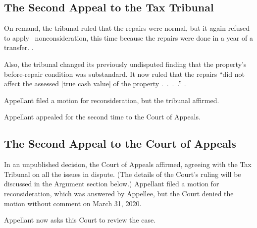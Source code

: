 \documentclass[12pt,\documentclassflag]{michiganCourtOfAppealsBrief}
\begin{document}
\subsection{The Second Appeal to the Tax Tribunal}

On remand, the tribunal ruled that the repairs were normal, but it again refused to apply \mathieuGast\ nonconsideration, this time because
the repairs were done in a year of a transfer. .

Also, the tribunal changed its previously undisputed finding that the property's before-repair condition was substandard. It now ruled that the repairs ``did not affect the assessed [true cash value] of the property .~.~.~.'' .

Appellant filed a motion for reconsideration, but the tribunal affirmed.

Appellant appealed for the second time to the Court of Appeals.

\subsection{The Second Appeal to the Court of Appeals}

In an unpublished decision, the Court of Appeals affirmed, agreeing with the Tax Tribunal on all the issues in dispute. (The details of the Court's ruling will be discussed in the Argument section below.) Appellant filed a motion for reconsideration, which was answered by Appellee, but the Court denied the motion without comment on March 31, 2020.

Appellant now asks this Court to review the case.




\end{document}
